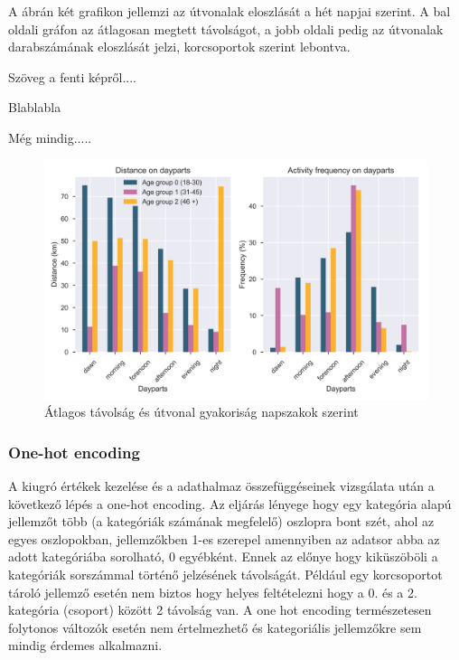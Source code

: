 A  ábrán két grafikon jellemzi az útvonalak eloszlását a hét napjai szerint. A bal oldali gráfon az átlagosan megtett távolságot, a jobb oldali pedig az útvonalak darabszámának eloszlását jelzi, korcsoportok szerint lebontva.


Szöveg a fenti képről....

Blablabla

Még mindig.....


\begin{figure}[!h]
	\includegraphics[width=\linewidth]{kepek/FrequencyAndDistanceOnDayparts.png}
	\caption{Átlagos távolság és útvonal gyakoriság napszakok szerint}
	\label{fig:distanceAndFrequencyByDayparts}
\end{figure}









\subsubsection{One-hot encoding}
A kiugró értékek kezelése és a adathalmaz összefüggéseinek vizsgálata után a következő lépés a one-hot encoding. Az eljárás lényege hogy egy kategória alapú jellemzőt több (a kategóriák számának megfelelő) oszlopra bont szét, ahol az egyes oszlopokban, jellemzőkben 1-es szerepel amennyiben az adatsor abba az adott kategóriába sorolható, 0 egyébként. Ennek az előnye hogy kiküszöböli a kategóriák sorszámmal történő jelzésének távolságát. Például egy korcsoportot tároló jellemző esetén nem biztos hogy helyes feltételezni hogy a 0. és a 2. kategória (csoport) között 2 távolság van. A one hot encoding természetesen folytonos változók esetén nem értelmezhető és kategoriális jellemzőkre sem mindig érdemes alkalmazni.

